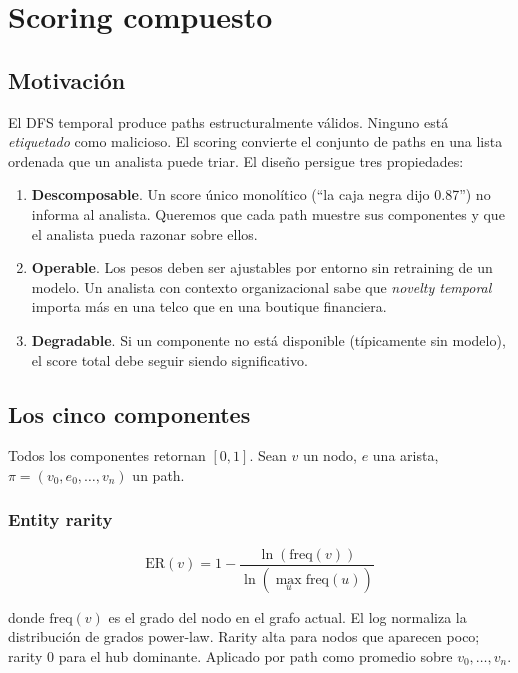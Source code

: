 \chapter{Scoring compuesto}
\label{sec:paper-score}

\section{Motivación}

El DFS temporal produce paths estructuralmente válidos. Ninguno
está \emph{etiquetado} como malicioso. El scoring convierte el
conjunto de paths en una lista ordenada que un analista puede
triar. El diseño persigue tres propiedades:

\begin{enumerate}
    \item \textbf{Descomposable}. Un score único monolítico (``la
    caja negra dijo 0.87'') no informa al analista. Queremos que
    cada path muestre sus componentes y que el analista pueda
    razonar sobre ellos.
    \item \textbf{Operable}. Los pesos deben ser ajustables por
    entorno sin retraining de un modelo. Un analista con contexto
    organizacional sabe que \emph{novelty temporal} importa más
    en una telco que en una boutique financiera.
    \item \textbf{Degradable}. Si un componente no está disponible
    (típicamente  sin modelo), el score total
    debe seguir siendo significativo.
\end{enumerate}

\section{Los cinco componentes}

Todos los componentes retornan $[0, 1]$. Sean $v$ un nodo, $e$ una
arista, $\pi = (v_0, e_0, \dots, v_n)$ un path.

\subsection{Entity rarity}

\[
\text{ER}(v) = 1 - \frac{\ln(\text{freq}(v))}{\ln(\max_u \text{freq}(u))}
\]

donde $\text{freq}(v)$ es el grado del nodo en el grafo actual.
El log normaliza la distribución de grados power-law. Rarity alta
para nodos que aparecen poco; rarity 0 para el hub dominante.
Aplicado por path como promedio sobre $v_0, \dots, v_n$.

